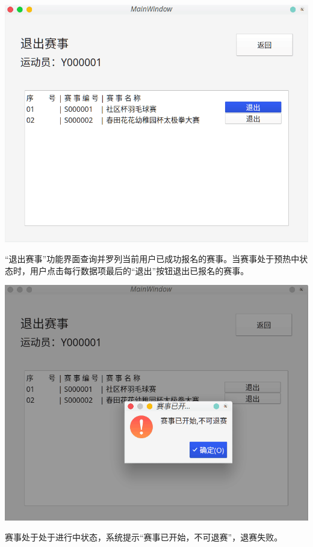 \documentclass[a4paper,UTF8]{article}
\begin{document}
{\centering\includegraphics[width=1\columnwidth]{12.png}
	
}

“退出赛事”功能界面查询并罗列当前用户已成功报名的赛事。当赛事处于预热中状态时，用户点击每行数据项最后的“退出”按钮退出已报名的赛事。

{\centering\includegraphics[width=1\columnwidth]{13.png}
	
}

赛事处于处于进行中状态，系统提示“赛事已开始，不可退赛”，退赛失败。
\end{document}
